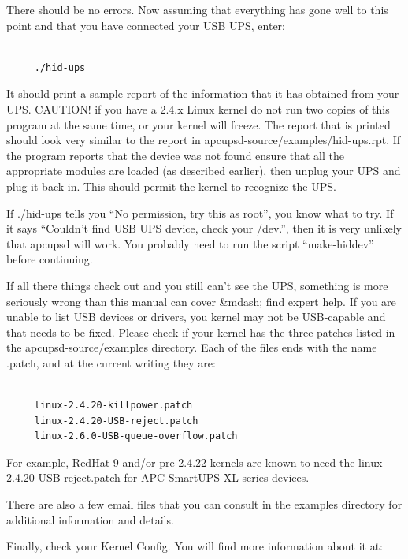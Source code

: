 There should be no errors. Now assuming that everything has gone well to this
point and that you have connected your USB UPS, enter:  

\label{index-hid_002dups-17}

\footnotesize
\begin{verbatim}
     
     ./hid-ups
\end{verbatim}
\normalsize

It should print a sample report of the information that it has obtained from
your UPS. CAUTION! if you have a 2.4.x Linux kernel do not run two copies of
this program at the same time, or your kernel will freeze. The report that is
printed should look very similar to the report in
\lt{}apcupsd-source\gt{}/examples/hid-ups.rpt. If the program reports that the
device was not found ensure that all the appropriate modules are loaded (as
described earlier), then unplug your UPS and plug it back in. This should
permit the kernel to recognize the UPS.  

If ./hid-ups tells you ``No permission, try this as root'', you know what to
try. If it says ``Couldn't find USB UPS device, check your /dev.'', then it is
very unlikely that apcupsd will work.  You probably need to run the script
``make-hiddev'' before continuing.  

If all there things check out and you still can't see the UPS, something is
more seriously wrong than this manual can cover \&mdash; find expert help.  If
you are unable to list USB devices or drivers, you kernel may not be
USB-capable and that needs to be fixed. Please check if your kernel has the
three patches listed in the \lt{}apcupsd-source\gt{}/examples directory. Each
of the files ends with the name .patch, and at the current writing they are: 

\footnotesize
\begin{verbatim}
     
     linux-2.4.20-killpower.patch
     linux-2.4.20-USB-reject.patch
     linux-2.6.0-USB-queue-overflow.patch
\end{verbatim}
\normalsize

For example, RedHat 9 and/or pre-2.4.22 kernels are known to need the
linux-2.4.20-USB-reject.patch for APC SmartUPS XL series devices.  

There are also a few email files that you can consult in the examples
directory for additional information and details.  

Finally, check your Kernel Config. You will find more information about it at:

